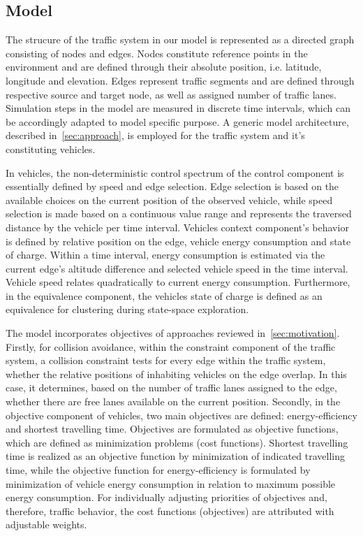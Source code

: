 \documentclass[conference]{../cls/IEEEtran}
\begin{document}
\subsection{Model}

The strucure of the traffic system in our model is represented as a directed
graph consisting of nodes and edges. Nodes constitute reference points in the 
environment and are defined through their absolute position, i.e. latitude,
longitude and elevation. Edges represent traffic segments and are defined
through respective source and target node, as well as assigned number of traffic lanes.
Simulation steps in the model are measured in discrete time intervals, which
can be accordingly adapted to model specific purpose. A generic model
architecture, described in~\ref{sec:approach}, is employed for the
traffic system and it's constituting vehicles.

In vehicles, the non-deterministic control spectrum of the control
component is essentially defined by speed and edge selection.
Edge selection is based on the available choices on the current position of the observed
vehicle, while speed selection is made based on a continuous value range and
represents the traversed distance by the vehicle per time interval. Vehicles
context component's behavior is defined by relative position on the edge, vehicle energy
consumption and state of charge. Within a time interval, energy consumption
is estimated via the current edge's altitude difference and selected
vehicle speed in the time interval. Vehicle speed relates quadratically to
current energy consumption. Furthermore, in the equivalence component, the
vehicles state of charge is defined as an equivalence for clustering during state-space exploration.

The model incorporates objectives of approaches reviewed in~\ref{sec:motivation}. 
Firstly, for collision avoidance, within the constraint
component of the traffic system, a collision constraint tests for every
edge within the traffic system, whether the relative positions of inhabiting
vehicles on the edge overlap. In this case, it determines, based on the number of traffic
lanes assigned to the edge, whether there are free lanes available on the
current position. Secondly, in the objective component of vehicles, two main
objectives are defined: energy-efficiency and shortest travelling time.
Objectives are formulated as objective functions, which are defined as
minimization problems (cost functions). Shortest travelling time is realized as
an objective function by minimization of indicated travelling time, while the
objective function for energy-efficiency is formulated by minimization of vehicle
energy consumption in relation to maximum possible energy consumption.
For individually adjusting priorities of objectives and, therefore, traffic
behavior, the cost functions (objectives) are attributed with adjustable
weights.
\end{document}
